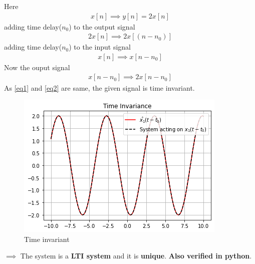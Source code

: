 \documentclass[journal,12pt,twocolumn]{IEEEtran}
\begin{document}
Here 
\begin{align}
    x[n]\implies y[n]=2x[n]
\end{align}
adding time delay($n_{0}$) to the output signal
\begin{align}
\label{eq1}
    2x[n]\implies 2x[(n-n_{0})]
\end{align}
adding time delay($n_{0}$) to the input signal 
\begin{align}
    x[n]\implies x[n-n_{0}]
\end{align}
Now the ouput signal 
\begin{align}
\label{eq2}
    x[n-n_{0}]\implies 2x[n-n_{0}]
\end{align}
As \ref{eq1} and \ref{eq2} are same, the given signal is time invariant. 

\begin{figure}[!htp]
    \centering
    \includegraphics[width = \columnwidth]{e.PNG}
    \caption{Time invariant}
    \label{f51}
\end{figure}

$\implies$ The system is a \textbf{LTI system }and it is \textbf{unique}.\textbf{ Also verified in python}.
\end{document}

